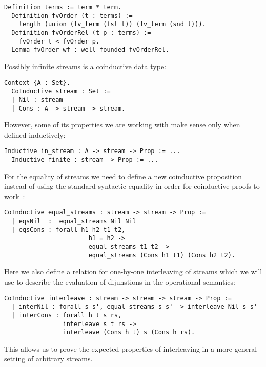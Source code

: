 \begin{lstlisting}[language=Coq]
  Definition terms := term * term.
  Definition fvOrder (t : terms) :=
    length (union (fv_term (fst t)) (fv_term (snd t))).
  Definition fvOrderRel (t p : terms) :=
    fvOrder t < fvOrder p.
  Lemma fvOrder_wf : well_founded fvOrderRel.
\end{lstlisting}

Possibly infinite streams is a coinductive data type:

\begin{lstlisting}[language=Coq]
  Context {A : Set}.
  CoInductive stream : Set :=
  | Nil : stream
  | Cons : A -> stream -> stream.
\end{lstlisting}

However, some of its properties we are working with make sense only when defined inductively:

\begin{lstlisting}[language=Coq]
  Inductive in_stream : A -> stream -> Prop := ...
  Inductive finite : stream -> Prop := ...
\end{lstlisting}

For the equality of streams we need to define a new coinductive proposition instead of using the standard syntactic equality in order for coinductive proofs to work~\cite{CPDT}:

\begin{lstlisting}[language=Coq]
  CoInductive equal_streams : stream -> stream -> Prop :=
  | eqsNil  :  equal_streams Nil Nil
  | eqsCons : forall h1 h2 t1 t2,
                       h1 = h2 ->
                       equal_streams t1 t2 ->
                       equal_streams (Cons h1 t1) (Cons h2 t2).
\end{lstlisting}

Here we also define a relation for one-by-one interleaving of streams which we will use to describe the evaluation of dijunstions in the operational semantics:

\begin{lstlisting}[language=Coq]
  CoInductive interleave : stream -> stream -> stream -> Prop :=
  | interNil : forall s s', equal_streams s s' -> interleave Nil s s'
  | interCons : forall h t s rs,
                interleave s t rs ->
                interleave (Cons h t) s (Cons h rs).
\end{lstlisting}

This allows us to prove the expected properties of interleaving in a more general setting of arbitrary streams.

